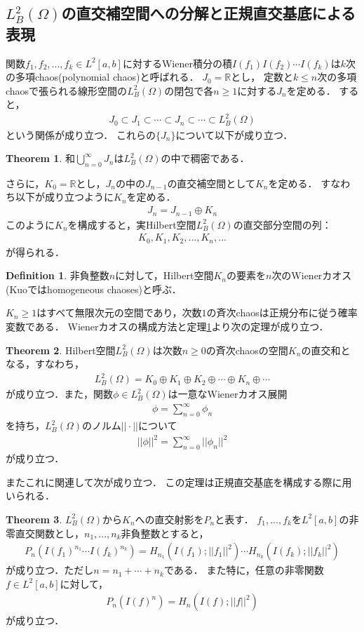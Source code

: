\documentclass[a4paper,10pt]{jsarticle}
\theoremstyle{definition}
\newtheorem{theorem}{Theorem}
\newtheorem{definition}{Definition}
\newcommand{\eq}[1]{\begin{align}#1\end{align}}
\begin{document}
\subsection{$L^2_B(\Omega)$の直交補空間への分解と正規直交基底による表現}
関数$f_1,f_2,...,f_k\in L^2[a,b]$に対するWiener積分の積$I(f_1)I(f_2)\cdots I(f_k)$は$k$次の多項chaos(polynomial chaos)と呼ばれる．
$J_0=\mathbb{R}$とし，
定数と$k\le n$次の多項chaosで張られる線形空間の$L^2_B(\Omega)$の閉包で各$n\ge 1$に対する$J_n$を定める．
すると，
\eq{J_0\subset J_1\subset\cdots\subset J_n\subset\cdots\subset L^2_B(\Omega)\label{9.4.5}}
という関係が成り立つ．
これらの$\{J_n\}$について以下が成り立つ．
\begin{theorem}\label{thm9.4.5}%
和$\bigcup_{n=0}^\infty J_n$は$L^2_B(\Omega)$の中で稠密である．
\end{theorem}

さらに，$K_0=\mathbb{R}$とし，$J_n$の中の$J_{n-1}$の直交補空間として$K_n$を定める．
すなわち以下が成り立つように$K_n$を定める．
\eq{J_n=J_{n-1}\oplus K_n}
このように$K_n$を構成すると，実Hilbert空間$L^2_B(\Omega)$の直交部分空間の列：
\eq{K_0,K_1,K_2,...,K_n,...}
が得られる．
\begin{definition}
非負整数$n$に対して，Hilbert空間$K_n$の要素を$n$次のWienerカオス(Kuo\cite{Kuo2006}ではhomogeneous chaoses)と呼ぶ．
\end{definition}
$K_n\ge 1$はすべて無限次元の空間であり，次数$1$の斉次chaosは正規分布に従う確率変数である．
Wienerカオスの構成方法と定理\ref{thm9.4.5}より次の定理が成り立つ．
\begin{theorem}\label{thm9.4.7}%
Hilbert空間$L^2_B(\Omega)$は次数$n\ge0$の斉次chaosの空間$K_n$の直交和となる，すなわち，
\eq{L^2_B(\Omega)=K_0\oplus K_1\oplus K_2\oplus\cdots\oplus K_n\oplus\cdots}
が成り立つ．また，関数$\phi\in L^2_B(\Omega)$は一意なWienerカオス展開
\eq{\phi=\sum_{n=0}^\infty\phi_n}
を持ち，$L^2_B(\Omega)$のノルム$||\cdot||$について
\eq{||\phi||^2=\sum_{n=0}^\infty||\phi_n||^2}
が成り立つ．
\end{theorem}
またこれに関連して次が成り立つ．
この定理は正規直交基底を構成する際に用いられる．
\begin{theorem}\label{thm9.4.9}%
$L^2_B(\Omega)$から$K_n$への直交射影を$P_n$と表す．
$f_1,...,f_k$を$L^2[a,b]$の非零直交関数とし，$n_1,...,n_k$非負整数とすると，
\eq{P_n(I(f_1)^{n_1}\cdots I(f_k)^{n_k})=H_{n_1}(I(f_1);||f_1||^2)\cdots H_{n_k}(I(f_k);||f_k||^2)}
が成り立つ．ただし$n=n_1+\cdots+n_k$である．
また特に，任意の非零関数$f\in L^2[a,b]$に対して，
\eq{P_n(I(f)^n)=H_n(I(f);||f||^2)}
が成り立つ．
\end{theorem}
\end{document}
